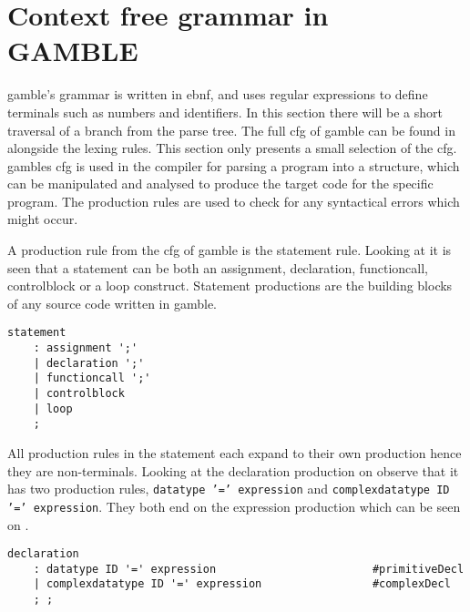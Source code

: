 \section{Context free grammar in GAMBLE}
\gls{gamble}'s grammar is written in \acrfull{ebnf}, and uses regular expressions to define terminals such as numbers and identifiers.
In this section there will be a short traversal of a branch from the parse tree.
The full \acrshort{cfg} of \gls{gamble} can be found in  alongside the lexing rules.
This section only presents a small selection of the \acrshort{cfg}.
\gls{gamble}s \acrshort{cfg} is used in the compiler for parsing a program into a structure, which can be manipulated and analysed to produce the target code for the specific program.
The production rules are used to check for any syntactical errors which might occur.

A production rule from the \acrshort{cfg} of \gls{gamble} is the statement rule. 
Looking at  it is seen that a statement can be both an assignment, declaration, functioncall, controlblock or a loop construct. 
Statement productions are the building blocks of any source code written in \gls{gamble}.

\begin{lstlisting}[caption={\acrshort{cfg} for Statements in \gls{gamble}},frame=tlrb,label={lst:statements},numbers=none]
statement
    : assignment ';'
    | declaration ';'
    | functioncall ';'
    | controlblock 
    | loop
    ;
\end{lstlisting}

All production rules in the statement each expand to their own production hence they are non-terminals.
Looking at the declaration production on  observe that it has two production rules, \texttt{datatype '=' expression} and \texttt{complexdatatype ID '=' expression}. 
They both end on the expression production which can be seen on .

\begin{lstlisting}[caption={\acrshort{cfg} for Declarations in \gls{gamble}},frame=tlrb,label={lst:declaration},numbers=none]
declaration
    : datatype ID '=' expression                        #primitiveDecl
    | complexdatatype ID '=' expression                 #complexDecl
    ; ;
\end{lstlisting}

